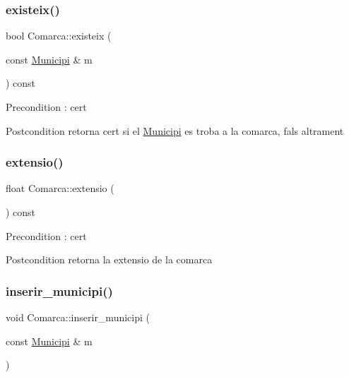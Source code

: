 \subsubsection{\texorpdfstring{existeix()}{existeix()}}
{\footnotesize\ttfamily bool Comarca\+::existeix (\begin{DoxyParamCaption}\item[{const \hyperlink{classMunicipi}{Municipi} \&}]{m }\end{DoxyParamCaption}) const}

\begin{DoxyPrecond}{Precondition}
\+: cert 
\end{DoxyPrecond}
\begin{DoxyPostcond}{Postcondition}
retorna cert si el \hyperlink{classMunicipi}{Municipi} es troba a la comarca, fals altrament 
\end{DoxyPostcond}
\mbox{\label{classComarca_a311187319875b89b31a8ea4271fca03a}} 
\subsubsection{\texorpdfstring{extensio()}{extensio()}}
{\footnotesize\ttfamily float Comarca\+::extensio (\begin{DoxyParamCaption}{ }\end{DoxyParamCaption}) const}

\begin{DoxyPrecond}{Precondition}
\+: cert 
\end{DoxyPrecond}
\begin{DoxyPostcond}{Postcondition}
retorna la extensio de la comarca 
\end{DoxyPostcond}
\mbox{\label{classComarca_a625e401c9a331b1860bf2a95495e29b5}} 
\subsubsection{\texorpdfstring{inserir\+\_\+municipi()}{inserir\_municipi()}}
{\footnotesize\ttfamily void Comarca\+::inserir\+\_\+municipi (\begin{DoxyParamCaption}\item[{const \hyperlink{classMunicipi}{Municipi} \&}]{m }\end{DoxyParamCaption})}

